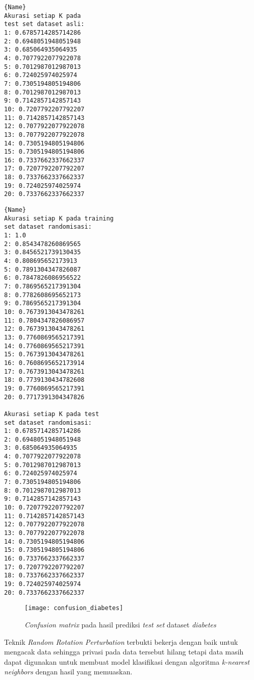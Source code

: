 \begin{itemize}
\begin{minipage}{.44\textwidth}
\begin{lstlisting}[caption=Akurasi Dataset Asli,frame=tlrb, label=diabetes_akurasi_asli]{Name}
Akurasi setiap K pada 
test set dataset asli: 
1: 0.6785714285714286
2: 0.6948051948051948
3: 0.685064935064935
4: 0.7077922077922078
5: 0.7012987012987013
6: 0.724025974025974
7: 0.7305194805194806
8: 0.7012987012987013
9: 0.7142857142857143
10: 0.7207792207792207
11: 0.7142857142857143
12: 0.7077922077922078
13: 0.7077922077922078
14: 0.7305194805194806
15: 0.7305194805194806
16: 0.7337662337662337
17: 0.7207792207792207
18: 0.7337662337662337
19: 0.724025974025974
20: 0.7337662337662337
		\end{lstlisting}
	\end{minipage}\hfill
	\begin{minipage}{.46\textwidth}
		\begin{lstlisting}[caption=Akurasi Dataset Randomisasi,frame=tlrb, label=diabetes_akurasi_randomisasi]{Name}
Akurasi setiap K pada training 
set dataset randomisasi: 
1: 1.0
2: 0.8543478260869565
3: 0.8456521739130435
4: 0.808695652173913
5: 0.7891304347826087
6: 0.7847826086956522
7: 0.7869565217391304
8: 0.7782608695652173
9: 0.7869565217391304
10: 0.7673913043478261
11: 0.7804347826086957
12: 0.7673913043478261
13: 0.7760869565217391
14: 0.7760869565217391
15: 0.7673913043478261
16: 0.7608695652173914
17: 0.7673913043478261
18: 0.7739130434782608
19: 0.7760869565217391
20: 0.7717391304347826

Akurasi setiap K pada test 
set dataset randomisasi: 
1: 0.6785714285714286
2: 0.6948051948051948
3: 0.685064935064935
4: 0.7077922077922078
5: 0.7012987012987013
6: 0.724025974025974
7: 0.7305194805194806
8: 0.7012987012987013
9: 0.7142857142857143
10: 0.7207792207792207
11: 0.7142857142857143
12: 0.7077922077922078
13: 0.7077922077922078
14: 0.7305194805194806
15: 0.7305194805194806
16: 0.7337662337662337
17: 0.7207792207792207
18: 0.7337662337662337
19: 0.724025974025974
20: 0.7337662337662337
		\end{lstlisting}
	\end{minipage}

	\begin{figure}
		\centering
		\texttt{[image: confusion\_diabetes]}
		\caption{\textit{Confusion matrix} pada hasil prediksi \textit{test set} dataset \textit{diabetes}}
		\label{fig:confusion_diabetes}
	\end{figure}
		
\end{itemize}

Teknik \textit{Random Rotation Perturbation} terbukti bekerja dengan baik untuk mengacak data sehingga privasi pada data tersebut hilang tetapi data masih dapat digunakan untuk membuat model klasifikasi dengan algoritma \textit{k-nearest neighbors} dengan hasil yang memuaskan. 

